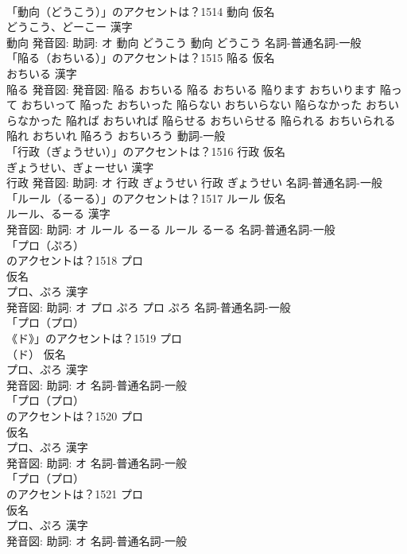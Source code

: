 \documentclass[8pt]{extreport}
\begin{document}
\begin{CJK}{UTF8}{min}
\\	「動向（どうこう）」のアクセントは？1514	動向 仮名　
\\	どうこう、どーこー 漢字　
\\	動向 発音図: 助詞: オ	動向 どうこう		動向 どうこう				名詞-普通名詞-一般 
\\	「陥る（おちいる）」のアクセントは？1515	陥る 仮名　
\\	おちいる 漢字　
\\	陥る 発音図: 発音図:	陥る おちいる		陥る おちいる 陥ります おちいります 陥って おちいって 陥った おちいった 陥らない おちいらない 陥らなかった おちいらなかった 陥れば おちいれば 陥らせる おちいらせる 陥られる おちいられる 陥れ おちいれ 陥ろう おちいろう				動詞-一般 
\\	「行政（ぎょうせい）」のアクセントは？1516	行政 仮名　
\\	ぎょうせい、ぎょーせい 漢字　
\\	行政 発音図: 助詞: オ	行政 ぎょうせい		行政 ぎょうせい				名詞-普通名詞-一般 
\\	「ルール（るーる）」のアクセントは？1517	ルール 仮名　
\\	ルール、るーる 漢字　
\\	発音図: 助詞: オ	ルール るーる		ルール るーる				名詞-普通名詞-一般 
\\	「プロ（ぷろ）
\\	のアクセントは？1518	プロ
\\	仮名　
\\	プロ、ぷろ 漢字　
\\	発音図: 助詞: オ	プロ ぷろ		プロ ぷろ				名詞-普通名詞-一般 
\\	「プロ（プロ）
\\	《ド》」のアクセントは？1519	プロ
\\	（ド） 仮名　
\\	プロ、ぷろ 漢字　
\\	発音図: 助詞: オ							名詞-普通名詞-一般 
\\	「プロ（プロ）
\\	のアクセントは？1520	プロ
\\	仮名　
\\	プロ、ぷろ 漢字　
\\	発音図: 助詞: オ							名詞-普通名詞-一般 
\\	「プロ（プロ）
\\	のアクセントは？1521	プロ
\\	仮名　
\\	プロ、ぷろ 漢字　
\\	発音図: 助詞: オ							名詞-普通名詞-一般 

\end{CJK}
\end{document}
